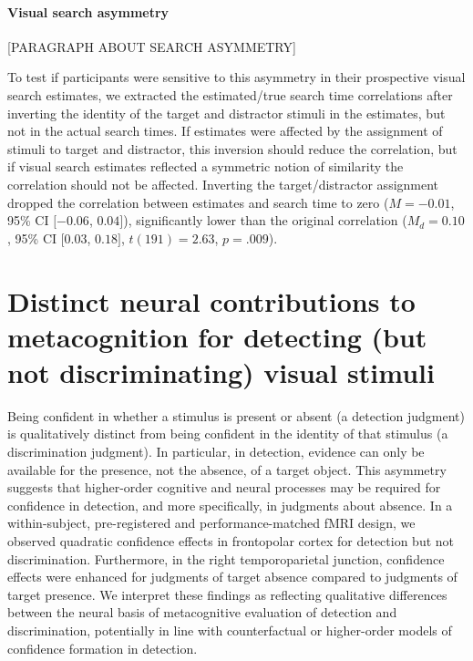 \documentclass[12pt,twoside]{reedthesis}
\begin{document}
\hypertarget{asymmetry}{%
\subsubsection*{Visual search asymmetry}\label{asymmetry}}

{[}PARAGRAPH ABOUT SEARCH ASYMMETRY{]}

To test if participants were sensitive to this asymmetry in their prospective visual search estimates, we extracted the estimated/true search time correlations after inverting the identity of the target and distractor stimuli in the estimates, but not in the actual search times. If estimates were affected by the assignment of stimuli to target and distractor, this inversion should reduce the correlation, but if visual search estimates reflected a symmetric notion of similarity the correlation should not be affected. Inverting the target/distractor assignment dropped the correlation between estimates and search time to zero (\(M = -0.01\), 95\% CI \([-0.06\), \(0.04]\)), significantly lower than the original correlation (\(M_d = 0.10\), 95\% CI \([0.03\), \(0.18]\), \(t(191) = 2.63\), \(p = .009\)).

\hypertarget{distinct-neural-contributions-to-metacognition-for-detecting-but-not-discriminating-visual-stimuli}{%
\chapter{Distinct neural contributions to metacognition for detecting (but not discriminating) visual stimuli}\label{distinct-neural-contributions-to-metacognition-for-detecting-but-not-discriminating-visual-stimuli}}

Being confident in whether a stimulus is present or absent (a detection judgment) is qualitatively distinct from being confident in the identity of that stimulus (a discrimination judgment). In particular, in detection, evidence can only be available for the presence, not the absence, of a target object. This asymmetry suggests that higher-order cognitive and neural processes may be required for confidence in detection, and more specifically, in judgments about absence. In a within-subject, pre-registered and performance-matched fMRI design, we observed quadratic confidence effects in frontopolar cortex for detection but not discrimination. Furthermore, in the right temporoparietal junction, confidence effects were enhanced for judgments of target absence compared to judgments of target presence. We interpret these findings as reflecting qualitative differences between the neural basis of metacognitive evaluation of detection and discrimination, potentially in line with counterfactual or higher-order models of confidence formation in detection.
\end{document}
